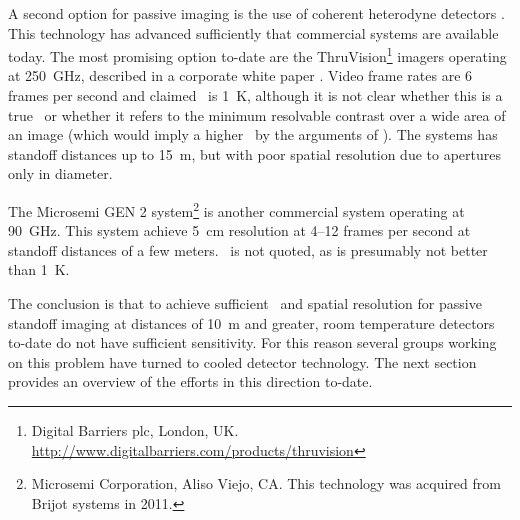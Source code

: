 A second option for passive imaging is the use of coherent heterodyne detectors \cite{rieke_detection_2003,rogalski_terahertz_2011}.
This technology has advanced sufficiently that commercial systems are available today.
The most promising option to-date are the ThruVision\footnote{Digital Barriers plc, London, UK. \url{http://www.digitalbarriers.com/products/thruvision}} imagers operating at \SI{250}{\GHz}, described in a corporate white paper \cite{digital_barriers_extra_????}.
Video frame rates are 6 frames per second and claimed \NETD\ is \SI{1}{\K}, although it is not clear whether this is a true \NETD\ or whether it refers to the minimum resolvable contrast over a wide area of an image (which would imply a higher \NETD\ by the arguments of ).
The systems has standoff distances up to \SI{15}{\m}, but with poor spatial resolution due to apertures only  in diameter.

The Microsemi GEN 2 system\footnote{%
Microsemi Corporation, Aliso Viejo, CA. This technology was acquired from Brijot systems in 2011.}
is another commercial system operating at \SI{90}{\GHz}.
This system achieve \SI{5}{\cm} resolution at 4--12 frames per second at standoff distances of a few meters.
\NETD\ is not quoted, as is presumably not better than \SI{1}{\K}.

The conclusion is that to achieve sufficient \NETD\ and spatial resolution for passive standoff imaging at distances of \SI{10}{\m} and greater, room temperature detectors to-date do not have sufficient sensitivity.
For this reason several groups working on this problem have turned to cooled detector technology.
The next section provides an overview of the efforts in this direction to-date.

% 


